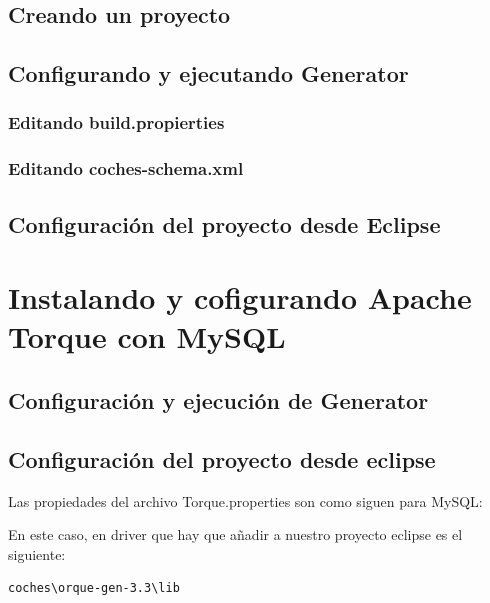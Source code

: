 \documentclass[12pt, oneside]{article}
\begin{document}
	\subsection{Creando un proyecto}
		

	\subsection{Configurando y ejecutando Generator}
		

		\subsubsection{Editando build.propierties}
			

		\subsubsection{Editando coches-schema.xml}
			

	\subsection{Configuración del proyecto desde Eclipse}
		
	
\section{Instalando y cofigurando Apache Torque con MySQL}
	

	\subsection{Configuración y ejecución de Generator}
		

\subsection{Configuración del proyecto desde eclipse}
Las propiedades del archivo Torque.properties son como siguen para MySQL:



En este caso, en driver que hay que añadir a nuestro proyecto eclipse es el siguiente:
\begin{lstlisting}
coches\orque-gen-3.3\lib
\end{lstlisting}
\end{document}
